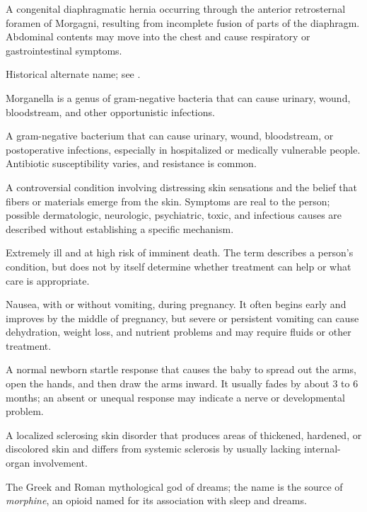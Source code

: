  A congenital diaphragmatic hernia occurring through the anterior retrosternal foramen of
Morgagni, resulting from incomplete fusion of parts of the diaphragm. Abdominal contents
may move into the chest and cause respiratory or gastrointestinal symptoms.

 Historical alternate name; see .

 Morganella is a genus of gram-negative bacteria that can cause urinary, wound, bloodstream, and other opportunistic infections.

 A gram-negative bacterium that can cause urinary, wound, bloodstream, or postoperative infections, especially in hospitalized or medically vulnerable people. Antibiotic susceptibility varies, and resistance is common.

 A controversial condition involving distressing skin sensations and the belief that fibers or materials emerge from the skin. Symptoms are real to the person; possible dermatologic, neurologic, psychiatric, toxic, and infectious causes are described without establishing a specific mechanism.

 Extremely ill and at high risk of imminent death. The term describes a person's condition, but does not by itself determine whether treatment can help or what care is appropriate.

 Nausea, with or without vomiting, during pregnancy. It often begins early and improves by the middle of pregnancy, but severe or persistent vomiting can cause dehydration, weight loss, and nutrient problems and may require fluids or other treatment.

 A normal newborn startle response that causes the baby to spread out the arms, open the hands, and then draw the arms inward. It usually fades by about 3 to 6 months; an absent or unequal response may indicate a nerve or developmental problem.

 A localized sclerosing skin disorder that produces areas of thickened, hardened, or discolored skin and differs from systemic sclerosis by usually lacking internal-organ involvement.

 The Greek and Roman mythological god of dreams; the name is the source of \textit{morphine}, an opioid named for its association with sleep and dreams.


